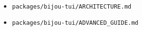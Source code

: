 \begin{itemize}
  \texttt{p\allowbreak{}a\allowbreak{}c\allowbreak{}k\allowbreak{}a\allowbreak{}g\allowbreak{}e\allowbreak{}s\allowbreak{}/\allowbreak{}b\allowbreak{}i\allowbreak{}j\allowbreak{}o\allowbreak{}u\allowbreak{}-\allowbreak{}t\allowbreak{}u\allowbreak{}i\allowbreak{}/\allowbreak{}s\allowbreak{}r\allowbreak{}c\allowbreak{}/\allowbreak{}r\allowbreak{}u\allowbreak{}n\allowbreak{}t\allowbreak{}i\allowbreak{}m\allowbreak{}e\allowbreak{}-\allowbreak{}e\allowbreak{}n\allowbreak{}g\allowbreak{}i\allowbreak{}n\allowbreak{}e\allowbreak{}.\allowbreak{}t\allowbreak{}s}
\item
  \texttt{p\allowbreak{}a\allowbreak{}c\allowbreak{}k\allowbreak{}a\allowbreak{}g\allowbreak{}e\allowbreak{}s\allowbreak{}/\allowbreak{}b\allowbreak{}i\allowbreak{}j\allowbreak{}o\allowbreak{}u\allowbreak{}-\allowbreak{}t\allowbreak{}u\allowbreak{}i\allowbreak{}/\allowbreak{}A\allowbreak{}R\allowbreak{}C\allowbreak{}H\allowbreak{}I\allowbreak{}T\allowbreak{}E\allowbreak{}C\allowbreak{}T\allowbreak{}U\allowbreak{}R\allowbreak{}E\allowbreak{}.\allowbreak{}m\allowbreak{}d}
\item
  \texttt{p\allowbreak{}a\allowbreak{}c\allowbreak{}k\allowbreak{}a\allowbreak{}g\allowbreak{}e\allowbreak{}s\allowbreak{}/\allowbreak{}b\allowbreak{}i\allowbreak{}j\allowbreak{}o\allowbreak{}u\allowbreak{}-\allowbreak{}t\allowbreak{}u\allowbreak{}i\allowbreak{}/\allowbreak{}A\allowbreak{}D\allowbreak{}V\allowbreak{}A\allowbreak{}N\allowbreak{}C\allowbreak{}E\allowbreak{}D\allowbreak{}\_\allowbreak{}G\allowbreak{}U\allowbreak{}I\allowbreak{}D\allowbreak{}E\allowbreak{}.\allowbreak{}m\allowbreak{}d}
\end{itemize}

